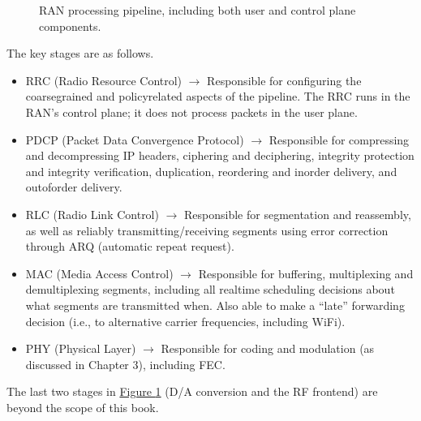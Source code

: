 \documentclass[a4paper,11pt,english]{sphinxmanual}
\let\sphinxpxdimen\pdfpxdimen\else\newdimen\sphinxpxdimen
\begin{document}
\begin{figure}[ht]
\centering
\capstart

\noindent\sphinxincludegraphics[width=600\sphinxpxdimen]{{Slide110}.png}
\caption{RAN processing pipeline, including both user and
control plane components.}\label{\detokenize{ran:id5}}\label{\detokenize{ran:fig-pipeline}}\end{figure}

\sphinxAtStartPar
The key stages are as follows.
\begin{itemize}
\item {} 
\sphinxAtStartPar
RRC (Radio Resource Control) \(\rightarrow\) Responsible for configuring the
coarse\sphinxhyphen{}grained and policy\sphinxhyphen{}related aspects of the pipeline. The RRC runs
in the RAN’s control plane; it does not process packets in the user
plane.

\item {} 
\sphinxAtStartPar
PDCP (Packet Data Convergence Protocol) \(\rightarrow\) Responsible for compressing
and decompressing IP headers, ciphering and deciphering, integrity
protection and integrity verification, duplication, reordering and
in\sphinxhyphen{}order delivery, and out\sphinxhyphen{}of\sphinxhyphen{}order delivery.

\item {} 
\sphinxAtStartPar
RLC (Radio Link Control) \(\rightarrow\) Responsible for segmentation and
reassembly, as well as reliably transmitting/receiving segments
using error correction through ARQ (automatic repeat request).

\item {} 
\sphinxAtStartPar
MAC (Media Access Control) \(\rightarrow\) Responsible for buffering, multiplexing
and demultiplexing segments, including all real\sphinxhyphen{}time scheduling
decisions about what segments are transmitted when. Also able to make
a “late” forwarding decision (i.e., to alternative carrier
frequencies, including Wi\sphinxhyphen{}Fi).

\item {} 
\sphinxAtStartPar
PHY (Physical Layer) \(\rightarrow\) Responsible for coding and modulation (as
discussed in Chapter 3), including FEC.

\end{itemize}

\sphinxAtStartPar
The last two stages in \hyperref[\detokenize{ran:fig-pipeline}]{Figure \ref{\detokenize{ran:fig-pipeline}}} (D/A
conversion and the RF front\sphinxhyphen{}end) are beyond the scope of this book.
\end{document}
